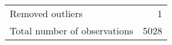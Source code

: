 \begin{tabular}{lr}
\hline
 Removed outliers             &    1 \\
 Total number of observations & 5028 \\
\hline
\end{tabular}
